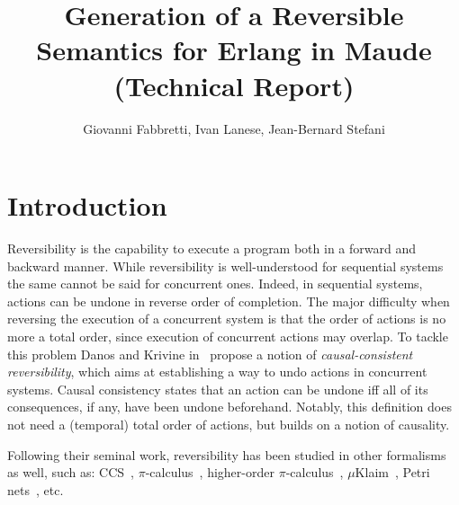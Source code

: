 \documentclass{article}[12pt,a4paper]
\theoremstyle{definition}
\begin{document}
\title{Generation of a Reversible Semantics for Erlang in Maude (Technical Report)}

\author{Giovanni Fabbretti, Ivan Lanese, Jean-Bernard Stefani}
\date{}

\maketitle %


\section{Introduction}


Reversibility is the capability to execute a program both in a forward
and backward manner. While reversibility is well-understood for
sequential systems the same cannot be said for concurrent
ones. Indeed, in sequential systems, actions can be undone in reverse
order of completion.  The major difficulty when reversing the
execution of a concurrent system is that the order of actions is no
more a total order, since execution of concurrent actions may overlap.
To tackle this problem Danos and Krivine in~\cite{DanosK04} propose a
notion of \emph{causal-consistent reversibility}, which aims at
establishing a way to undo actions in concurrent systems. Causal
consistency states that an action can be undone iff all of its
consequences, if any, have been undone beforehand. Notably, this
definition does not need a (temporal) total order of actions, but
builds on a notion of causality.

Following their seminal work, reversibility has been studied in other formalisms
as well, such as: CCS~\cite{DanosK04,PhillipsU07}, $\pi$-calculus~\cite{CristescuKV13}, higher-order $\pi$-calculus~\cite{LaneseMS16},
$\mu$Klaim~\cite{GiachinoLMT17}, Petri nets~\cite{PhilippouP18,MelgrattiMU20}, etc.
\end{document}
